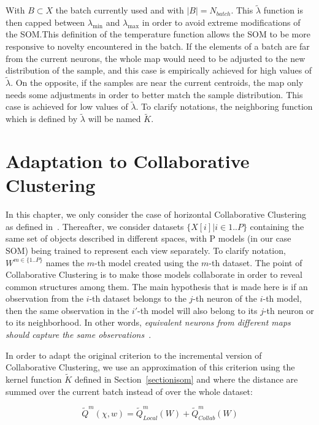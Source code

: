 	With $B \subset X$ the batch currently used and with $|B|=N_{batch}$. This $\widetilde{\lambda}$ function is then capped between $\lambda_{\min}$ and $\lambda_{\max}$ in order to avoid extreme modifications of the SOM.\@ This definition of the temperature function allows the SOM to be more responsive to novelty encountered in the batch. If the elements of a batch are far from the current neurons, the whole map would need to be adjusted to the new distribution of the sample, and this case is empirically achieved for high values of $\widetilde{\lambda}$. On the opposite, if the samples are near the current centroids, the map only needs some adjustments in order to better match the sample distribution. This case is achieved for low values of $\widetilde{\lambda}$. To clarify notations, the neighboring function which is defined by $\widetilde{\lambda}$ will be named $\widetilde{K}$.
	
	\section{Adaptation to Collaborative Clustering}
	In this chapter, we only consider the case of horizontal Collaborative Clustering as defined in~\cite{ghassany2012collaborative}. Thereafter, we consider datasets $\{X[i] | i \in 1..P\}$ containing the same set of objects described in different spaces, with P models (in our case SOM) being trained to represent each view separately. To clarify notation, $W^{m \in \{1..P\}}$ names the $m$-th model created using the $m$-th dataset. The point of Collaborative Clustering is to make those models collaborate in order to reveal common structures among them. The main hypothesis that is made here is if an observation from the $i$-th dataset belongs to the $j$-th neuron of the $i$-th model, then the same observation in the $i'$-th model will also belong to its $j$-th neuron or to its neighborhood. In other words, \textit{equivalent neurons from different maps should capture the same observations}~\cite{ghassany2012collaborative}.
		
	In order to adapt the original criterion to the incremental version of Collaborative Clustering, we use an approximation of this criterion using the kernel function $\widetilde{K}$ defined in Section~\ref{sectionisom} and where the distance are summed over the current batch instead of over the whole dataset:
	
		\begin{equation}
\label{criterion}
		\widetilde{Q}^m(\chi, w) = \widetilde{Q}_{Local}^m(W) + \widetilde{Q}_{Collab}^m(W)
		\end{equation}
		
